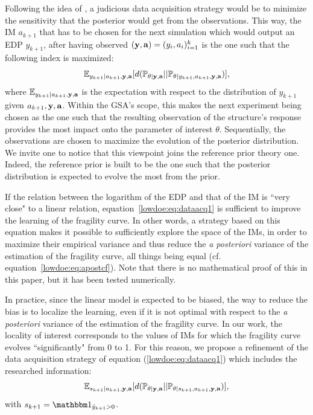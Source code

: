 Following the idea of \citet{da_veiga_global_2015}, a judicious data acquisition strategy would be to minimize the sensitivity that the posterior would get from the observations. This way, the IM $a_{k+1}$ that has to be chosen for the next simulation which would output an EDP $y_{k+1}$, after having observed $(\mathbf{y}, \mathbf{a})=(y_i,a_i)_{i=1}^k$ is the one such that the following index is maximized:
    \begin{equation}\label{lowdoe:eq:dataacq1}
        \mathbb{E}_{y_{k+1}|a_{k+1},\mathbf{y},\mathbf{a}}[d(\mathbb{P}_{\theta|\mathbf{y},\mathbf{a}} || \mathbb{P}_{\theta|y_{k+1},a_{k+1},\mathbf{y},\mathbf{a}} )],
    \end{equation}
where $\mathbb{E}_{y_{k+1}|a_{k+1},\mathbf{y},\mathbf{a}}$ is the expectation with respect to the distribution of $y_{k+1}$ given $a_{k+1},\mathbf{y},\mathbf{a}$.
Within the GSA's scope, this makes the next experiment being chosen as the one such that the resulting observation of the structure's response provides the most impact onto the parameter of interest $\theta$. Sequentially, the observations are chosen to maximize the evolution of the posterior distribution. We invite one to notice that this viewpoint joins the reference prior theory one. Indeed, the reference prior is built to be the one such that the posterior distribution is expected to evolve the most from the prior. %

If the relation between the logarithm of the EDP and that of the IM is ``very close" to a linear relation, equation~\eqref{lowdoe:eq:dataacq1} is sufficient to improve the learning of the fragility curve. In other words, a strategy based on this equation makes it possible to sufficiently explore the space of the IMs, in order to maximize their empirical variance and thus reduce the \emph{a posteriori} variance of the estimation of the fragility curve, all things being equal (cf. equation~\eqref{lowdoe:eq:apostcf}). Note that there is no mathematical proof of this in this paper, but it has been tested numerically. 

In practice, since the linear model is expected to be biased, the way to reduce the bias is to localize the learning, even if it is not optimal with respect to the \emph{a posteriori} variance of the estimation of the fragility curve. In our work, the locality of interest corresponds to the values of IMs for which the fragility curve evolves ``significantly" from 0 to 1. For this reason, we propose a refinement of the data acquisition strategy of equation (\ref{lowdoe:eq:dataacq1}) which includes the researched information:
    \begin{equation}\label{lowdoe:eq:ALs}
        \mathbb{E}_{ s_{k+1}|a_{k+1},\mathbf{y},\mathbf{a}}[d(\mathbb{P}_{\theta|\mathbf{y},\mathbf{a}} || \mathbb{P}_{\theta|s_{k+1},a_{k+1},\mathbf{y},\mathbf{a}} )],
    \end{equation}
with $s_{k+1}=\indic_{\hat y_{k+1}>0}$.

